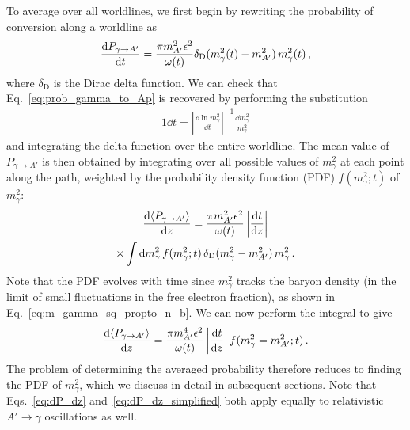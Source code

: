 \documentclass[prd,aps,10pt,nofootinbib,twocolumn,superscriptaddress,preprintnumbers,balancelastpage,longbibliography]{revtex4-1}
\begin{document}
To average over all worldlines, we first begin by rewriting the probability of conversion along a worldline as
%
\begin{alignat}{1}
    \frac{ \mathrm{d} P_{\gamma \to A'}}{\mathrm{d} t} = \frac{\pi m_{A^\prime}^2 \epsilon^2}{\omega(t)} \delta_\text{D}(m_\gamma^2(t) - m_{A^\prime}^2) \, m_\gamma^2(t) \,,
\end{alignat}
%
where $\delta_\text{D}$ is the Dirac delta function.
We can check that Eq.~\eqref{eq:prob_gamma_to_Ap} is recovered by performing the substitution
%
\begin{alignat}{1}
    \dd t = \left| \frac{\dd \ln m_\gamma^2}{\dd t} \right|^{-1} \!\! \frac{\dd m_\gamma^2}{m_\gamma^2}
    \label{eq:t_to_m_gamma_sq_sub}
\end{alignat}
%
and integrating the delta function over the entire worldline. 
The mean value of $P_{\gamma \to A'}$ is then obtained by integrating over all possible values of $m_\gamma^2$ at each point along the path, weighted by the probability density function (PDF) $f(m_\gamma^2;t)$ of $m_\gamma^2$:
%
\begin{multline}
    \frac{\mathrm{d} \langle P_{\gamma \to A'} \rangle}{\mathrm{d} z} = \frac{\pi m_{A^\prime}^2 \epsilon^2}{\omega(t)} \left| \frac{\mathrm{d} t}{\mathrm{d} z} \right| \\
    \times \int \mathrm{d} m_\gamma^2 \, f(m_\gamma^2;t) \, \delta_\text{D}(m_\gamma^2 - m_{A'}^2) \, m_\gamma^2 \,.
    \label{eq:dP_dz}
\end{multline}
%
Note that the PDF evolves with time since $m_\gamma^2$ tracks the baryon density (in the limit of small fluctuations in the free electron fraction), as shown in Eq.~\eqref{eq:m_gamma_sq_propto_n_b}. 
We can now perform the integral to give
%
\begin{alignat}{1}
    \frac{\mathrm{d} \langle P_{\gamma \to A'} \rangle}{\mathrm{d} z} = \frac{\pi m_{A^\prime}^4 \epsilon^2}{\omega(t)} \left| \frac{\mathrm{d} t}{\mathrm{d} z} \right| f(m_\gamma^2 = m_{A^\prime}^2; t) \,.
    \label{eq:dP_dz_simplified}
\end{alignat}
%
The problem of determining the averaged probability therefore reduces to finding the PDF of $m_\gamma^2$, which we discuss in detail in subsequent sections. Note that Eqs.~\eqref{eq:dP_dz} and~\eqref{eq:dP_dz_simplified} both apply equally to relativistic $A' \to \gamma$ oscillations as well. 
\end{document}
